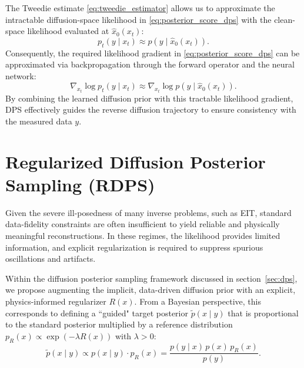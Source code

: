 \documentclass[a4paper,11pt]{article}
\theoremstyle{definition}
\theoremstyle{plain}
\theoremstyle{remark}
\begin{document}
The Tweedie estimate \eqref{eq:tweedie_estimator}  allows us to approximate the intractable diffusion-space likelihood in \eqref{eq:posterior_score_dps} with the clean-space likelihood evaluated at $\hat{x}_0(x_t)$:
\begin{equation}\label{eq:plugin}
p_t(y \mid x_t) \approx p\!\left(y \mid \hat{x}_0(x_t)\right).
\end{equation}
Consequently, the required likelihood gradient in \eqref{eq:posterior_score_dps} can be approximated via backpropagation through the forward operator and the neural network:
\begin{equation}\label{eq:plugin1}
\nabla_{x_t}\log p_t(y \mid x_t) \approx \nabla_{x_t}\log p\!\left(y \mid \hat{x}_0(x_t)\right).
\end{equation}
By combining the learned diffusion prior with this tractable likelihood gradient, DPS effectively guides the reverse diffusion trajectory to ensure consistency with the measured data $y$.

\section{Regularized Diffusion Posterior Sampling (RDPS)}\label{sec:proposed}

Given the severe ill-posedness of many inverse problems, such as EIT, 
standard data-fidelity constraints are often insufficient to yield reliable and physically meaningful reconstructions. 
In these regimes, the likelihood provides limited information, and explicit regularization is required to suppress spurious oscillations and artifacts.

Within the diffusion posterior sampling framework discussed in section~\ref{sec:dps}, we propose augmenting the implicit, data-driven diffusion prior with an explicit, physics-informed regularizer $R(x)$. From a Bayesian perspective, this corresponds to defining a ``guided" target posterior $\tilde{p}(x \mid y)$ that is proportional to the standard posterior multiplied by a reference distribution $p_R(x) \propto \exp(-\lambda R(x))$ with $\lambda >0$:
\begin{equation}
	\label{eq:comp}
	\tilde{p}(x \mid y) \propto p(x \mid y) \cdot p_R(x) = \frac{p(y \mid x)\,p(x)\,p_R(x)}{p(y)}.
\end{equation}
\end{document}
